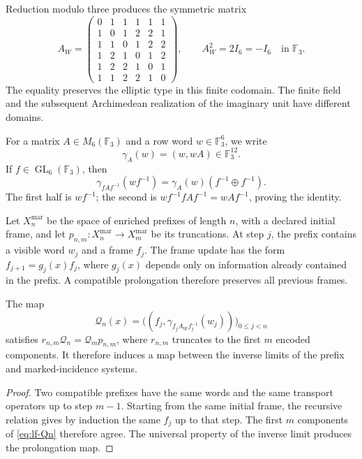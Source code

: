 Reduction modulo three produces the symmetric matrix
\begin{equation}
 A_W=
 \begin{pmatrix}
 0&1&1&1&1&1\\
 1&0&1&2&2&1\\
 1&1&0&1&2&2\\
 1&2&1&0&1&2\\
 1&2&2&1&0&1\\
 1&1&2&2&1&0
 \end{pmatrix},
 \qquad A_W^2=2I_6=-I_6
 \quad\text{in }\mathbb F_3.
 \label{eq:lf-aw}
\end{equation}
The equality preserves the elliptic type in this finite codomain.
The finite field and the subsequent Archimedean realization of the
imaginary unit have different domains.

For a matrix \(A\in M_6(\mathbb F_3)\) and a row word
\(w\in\mathbb F_3^6\), we write
\[
 \gamma_A(w)=(w,wA)\in\mathbb F_3^{12}.
\]
If \(f\in\operatorname{GL}_6(\mathbb F_3)\), then
\begin{equation}
 \gamma_{fAf^{-1}}(wf^{-1})
   =\gamma_A(w)(f^{-1}\oplus f^{-1}).
 \label{eq:lf-frame-covariance}
\end{equation}
The first half is \(wf^{-1}\); the second is
\(wf^{-1}fAf^{-1}=wAf^{-1}\), proving the identity.

Let \(X_n^{\mathrm{mar}}\) be the space of enriched prefixes of
length \(n\), with a declared initial frame, and let
\(p_{n,m}:X_n^{\mathrm{mar}}\to X_m^{\mathrm{mar}}\) be its
truncations. At step \(j\), the prefix contains a visible
word \(w_j\) and a frame \(f_j\). The frame update
has the form \(f_{j+1}=g_j(x)f_j\), where \(g_j(x)\) depends
only on information already contained in the prefix. A
compatible prolongation therefore preserves all previous
frames.

\begin{proposition}
\label{prop:lf-incidence-naturality}
The map
\begin{equation}
 \mathcal Q_n(x)=
 \bigl((f_j,\gamma_{f_jA_Wf_j^{-1}}(w_j))\bigr)_{0\leq j<n}
 \label{eq:lf-Qn}
\end{equation}
satisfies \(r_{n,m}\mathcal Q_n=\mathcal Q_mp_{n,m}\), where \(r_{n,m}\) truncates
to the first \(m\) encoded components. It therefore induces a
map between the inverse limits of the prefix
and marked-incidence systems.
\end{proposition}
\begin{proof}
Two compatible prefixes have the same words and the same
transport operators up to step \(m-1\). Starting from the
same initial frame, the recursive relation gives by induction the
same \(f_j\) up to that step. The first
\(m\) components of \eqref{eq:lf-Qn} therefore agree. The universal
property of the inverse limit produces the prolongation map.
\end{proof}

